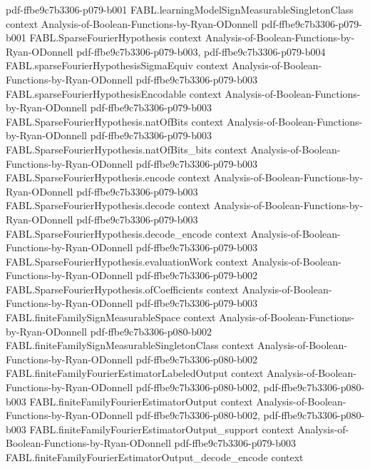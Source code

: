 \begin{theorem}
  {pdf-ffbe9c7b3306-p079-b001}
\proofstep
  {FABL.learningModelSignMeasurableSingletonClass}
  {context}
  {Analysis-of-Boolean-Functions-by-Ryan-ODonnell}
  {pdf-ffbe9c7b3306-p079-b001}
\proofstep
  {FABL.SparseFourierHypothesis}
  {context}
  {Analysis-of-Boolean-Functions-by-Ryan-ODonnell}
  {pdf-ffbe9c7b3306-p079-b003,
    pdf-ffbe9c7b3306-p079-b004}
\proofstep
  {FABL.sparseFourierHypothesisSigmaEquiv}
  {context}
  {Analysis-of-Boolean-Functions-by-Ryan-ODonnell}
  {pdf-ffbe9c7b3306-p079-b003}
\proofstep
  {FABL.sparseFourierHypothesisEncodable}
  {context}
  {Analysis-of-Boolean-Functions-by-Ryan-ODonnell}
  {pdf-ffbe9c7b3306-p079-b003}
\proofstep
  {FABL.SparseFourierHypothesis.natOfBits}
  {context}
  {Analysis-of-Boolean-Functions-by-Ryan-ODonnell}
  {pdf-ffbe9c7b3306-p079-b003}
\proofstep
  {FABL.SparseFourierHypothesis.natOfBits_bits}
  {context}
  {Analysis-of-Boolean-Functions-by-Ryan-ODonnell}
  {pdf-ffbe9c7b3306-p079-b003}
\proofstep
  {FABL.SparseFourierHypothesis.encode}
  {context}
  {Analysis-of-Boolean-Functions-by-Ryan-ODonnell}
  {pdf-ffbe9c7b3306-p079-b003}
\proofstep
  {FABL.SparseFourierHypothesis.decode}
  {context}
  {Analysis-of-Boolean-Functions-by-Ryan-ODonnell}
  {pdf-ffbe9c7b3306-p079-b003}
\proofstep
  {FABL.SparseFourierHypothesis.decode_encode}
  {context}
  {Analysis-of-Boolean-Functions-by-Ryan-ODonnell}
  {pdf-ffbe9c7b3306-p079-b003}
\proofstep
  {FABL.SparseFourierHypothesis.evaluationWork}
  {context}
  {Analysis-of-Boolean-Functions-by-Ryan-ODonnell}
  {pdf-ffbe9c7b3306-p079-b002}
\proofstep
  {FABL.SparseFourierHypothesis.ofCoefficients}
  {context}
  {Analysis-of-Boolean-Functions-by-Ryan-ODonnell}
  {pdf-ffbe9c7b3306-p079-b003}
\proofstep
  {FABL.finiteFamilySignMeasurableSpace}
  {context}
  {Analysis-of-Boolean-Functions-by-Ryan-ODonnell}
  {pdf-ffbe9c7b3306-p080-b002}
\proofstep
  {FABL.finiteFamilySignMeasurableSingletonClass}
  {context}
  {Analysis-of-Boolean-Functions-by-Ryan-ODonnell}
  {pdf-ffbe9c7b3306-p080-b002}
\proofstep
  {FABL.finiteFamilyFourierEstimatorLabeledOutput}
  {context}
  {Analysis-of-Boolean-Functions-by-Ryan-ODonnell}
  {pdf-ffbe9c7b3306-p080-b002,
    pdf-ffbe9c7b3306-p080-b003}
\proofstep
  {FABL.finiteFamilyFourierEstimatorOutput}
  {context}
  {Analysis-of-Boolean-Functions-by-Ryan-ODonnell}
  {pdf-ffbe9c7b3306-p080-b002,
    pdf-ffbe9c7b3306-p080-b003}
\proofstep
  {FABL.finiteFamilyFourierEstimatorOutput_support}
  {context}
  {Analysis-of-Boolean-Functions-by-Ryan-ODonnell}
  {pdf-ffbe9c7b3306-p079-b003}
\proofstep
  {FABL.finiteFamilyFourierEstimatorOutput_decode_encode}
  {context}

\end{theorem}
